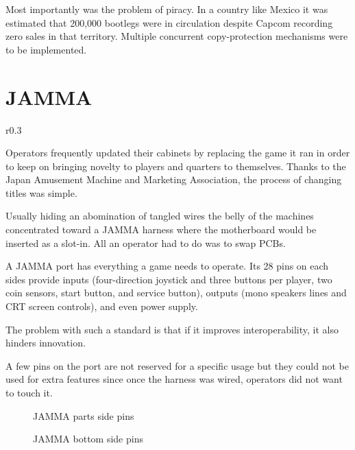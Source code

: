 Most importantly was the problem of piracy. In a country like Mexico it was estimated that 200,000 bootlegs were in circulation\cite{sf2_oral_history} despite Capcom recording zero sales in that territory. Multiple concurrent copy-protection mechanisms were to be implemented.



\section{JAMMA}



\begin{wrapfigure}[19]{r}{0.3\textwidth}
\vspace{-\baselineskip}
\centering
\end{wrapfigure}


Operators frequently updated their cabinets by replacing the game it ran in order to keep on bringing novelty to players and quarters to themselves. Thanks to the Japan Amusement Machine and Marketing Association, the process of changing titles was simple. 

Usually hiding an abomination of tangled wires the belly of the machines concentrated toward a JAMMA harness where the motherboard would be inserted as a slot-in. All an operator had to do was to swap PCBs.

A JAMMA port has everything a game needs to operate. Its 28 pins on each sides provide inputs (four-direction joystick and three buttons per player, two coin sensors, start button, and service button), outputs (mono speakers lines and CRT screen controls), and even power supply.

The problem with such a standard is that if it improves interoperability, it also hinders innovation. 

A few pins on the port are not reserved for a specific usage but they could not be used for extra features since once the harness was wired, operators did not want to touch it.



 \begin{figure}[H]
\caption*{JAMMA parts side pins}
\end{figure}

 \begin{figure}[H]
\caption*{JAMMA bottom side pins}
\end{figure}



